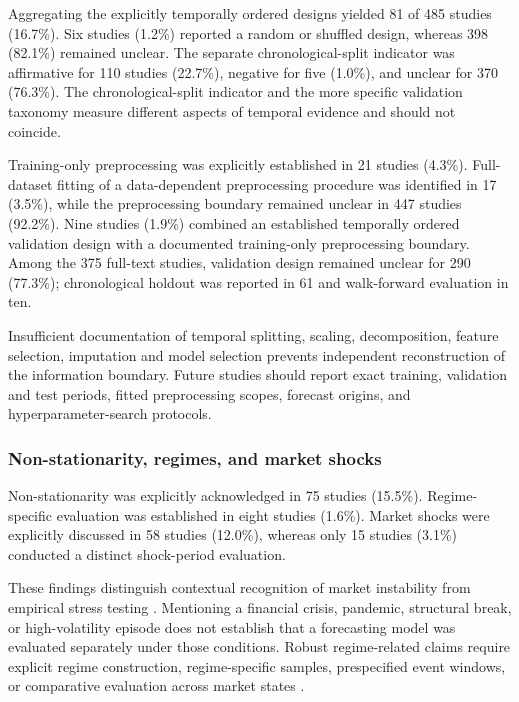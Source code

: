 \documentclass[pdflatex,sn-mathphys-num]{sn-jnl}%
\theoremstyle{thmstyleone}%
\theoremstyle{thmstyletwo}%
\theoremstyle{thmstylethree}%
\begin{document}
Aggregating the explicitly temporally ordered designs yielded 81 of
485 studies (16.7\%). Six studies (1.2\%) reported a random or shuffled
design, whereas 398 (82.1\%) remained unclear. The separate
chronological-split indicator was affirmative for 110 studies (22.7\%),
negative for five (1.0\%), and unclear for 370 (76.3\%). The
chronological-split indicator and the more specific validation taxonomy
measure different aspects of temporal evidence and should not coincide.

Training-only preprocessing was explicitly established in 21 studies
(4.3\%). Full-dataset fitting of a data-dependent preprocessing procedure
was identified in 17 (3.5\%), while the preprocessing boundary remained
unclear in 447 studies (92.2\%). Nine studies (1.9\%) combined an
established temporally ordered validation design with a documented
training-only preprocessing boundary. Among the 375 full-text studies,
validation design remained unclear for 290 (77.3\%); chronological
holdout was reported in 61 and walk-forward evaluation in ten.

Insufficient documentation of temporal splitting, scaling, decomposition,
feature selection, imputation and model selection prevents independent
reconstruction of the information boundary. Future studies should report
exact training, validation and test periods, fitted preprocessing scopes,
forecast origins, and hyperparameter-search protocols.

\subsubsection{Non-stationarity, regimes, and market shocks}
\label{subsubsec:regime-shock-audit}

Non-stationarity was explicitly acknowledged in 75 studies (15.5\%).
Regime-specific evaluation was established in eight studies (1.6\%).
Market shocks were explicitly discussed in 58 studies (12.0\%), whereas
only 15 studies (3.1\%) conducted a distinct shock-period evaluation.

These findings distinguish contextual recognition of market instability from
empirical stress testing \cite{P00050,P00178,P00367,P00553,P00642,P00826,P00890,P01187}.
Mentioning a financial crisis, pandemic, structural break, or high-volatility
episode does not establish that a forecasting model was evaluated separately
under those conditions. Robust regime-related claims require explicit regime
construction, regime-specific samples, prespecified event windows, or
comparative evaluation across market states
\cite{P00037,P00367,P00451,P00569,P00744,P00890,P01276,P02095}.
\end{document}
